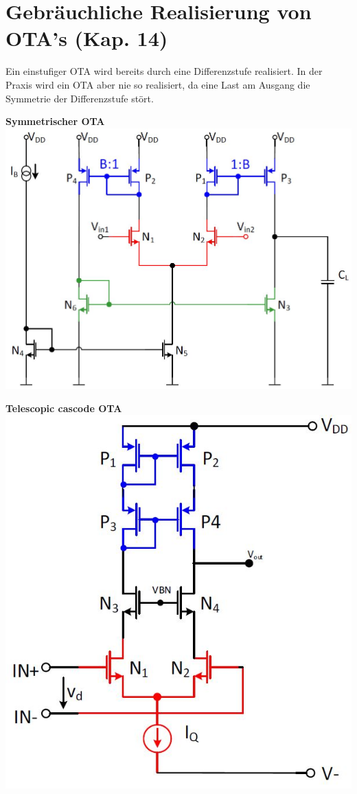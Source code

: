 \section{Gebräuchliche Realisierung von OTA's (Kap. 14)}
Ein einstufiger OTA wird bereits durch eine Differenzstufe realisiert.
In der Praxis wird ein OTA aber nie so realisiert, da eine Last am Ausgang die Symmetrie der Differenzstufe stört.\\[2ex]
\begin{minipage}[t]{0.25\textwidth}
	\textbf{Symmetrischer OTA}\\
	\includegraphics[width=1\linewidth]{chapters/OTA/images/SymmetrischerOTA}\\
\end{minipage}
\begin{minipage}[t]{0.25\textwidth}
	\textbf{Telescopic cascode OTA}\\
	\includegraphics[width=0.7\linewidth]{chapters/OTA/images/TelescopicCascodeOTA}\\
\end{minipage}
